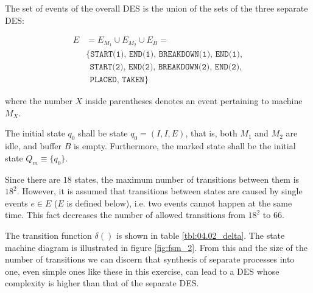 The set of events of the overall DES is the union of the sets of the three
separate DES:

\begin{align*}
  E &= E_{M_1} \cup E_{M_2} \cup E_{B} = \\
    & \{\texttt{START(1), END(1), BREAKDOWN(1), END(1)}, \\
    &\ \ \texttt{START(2), END(2), BREAKDOWN(2), END(2)}, \\
    &\ \ \texttt{PLACED, TAKEN}\}
\end{align*}

where the number $X$ inside parentheses denotes an event pertaining to machine
$M_X$.

The initial state $q_0$ shall be state $q_0 = (I,I,E)$, that is, both $M_1$ and
$M_2$ are idle, and buffer $B$ is empty. Furthermore, the marked state shall be
the initial state $Q_m \equiv \{q_0\}$.

Since there are $18$ states, the maximum number of transitions between them is
$18^2$. However, it is assumed that transitions between states are caused by
single events $e \in E$ ($E$ is defined below), i.e. two events cannot happen
at the same time. This fact decreases the number of allowed transitions from
$18^2$ to $66$.

The transition function $\delta()$ is shown in table \ref{tbl:04.02_delta}.
The state machine diagram is illustrated in figure \ref{fig:fsm_2}. From this
and the size of the number of transitions we can discern that synthesis of
separate processes into one, even simple ones like these in this exercise, can
lead to a DES whose complexity is higher than that of the separate DES.

